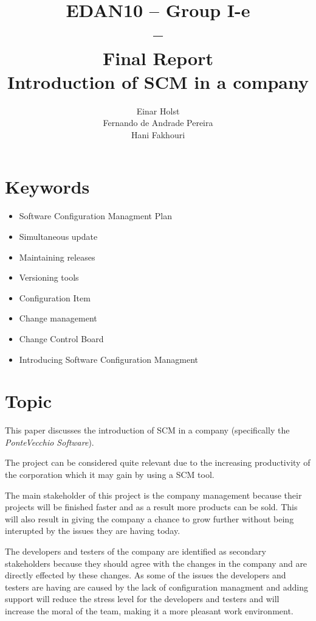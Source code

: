 \documentclass[a4paper]{article}
\title{EDAN10 -- Group I-e\\--\\ Final Report \\
Introduction of SCM in a company 
}
\author{Einar Holst \\
Fernando de Andrade Pereira \\
Hani Fakhouri
}
\begin{document}
\maketitle
\thispagestyle{empty}
\clearpage

\tableofcontents
\thispagestyle{empty}
\clearpage

\setcounter{page}{1}

\section{Keywords}
\begin{itemize}
\item Software Configuration Managment Plan
\item Simultaneous update
\item Maintaining releases
\item Versioning tools
\item Configuration Item
\item Change management
\item Change Control Board
\item Introducing Software Configuration Managment
\end{itemize}


\section{Topic}
This paper discusses the introduction of SCM in a company (specifically the \emph{PonteVecchio Software}).

The project can be considered quite relevant due to the increasing productivity of the corporation which it may gain by using a SCM tool.

The main stakeholder of this project is the company management because their projects will be finished faster and as a result more products can be sold. This will also result in giving the company a chance to grow further without being interupted by the issues they are having today.

The developers and testers of the company are identified as secondary stakeholders because they should agree with the changes in the company and are directly effected by these changes. As some of the issues the developers and testers are having are caused by the lack of configuration managment and adding support will reduce the stress level for the developers and testers and will increase the moral of the team, making it a more pleasant work environment.
\end{document}

